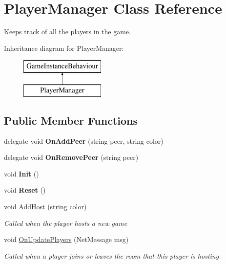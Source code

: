 \hypertarget{class_player_manager}{}\section{Player\+Manager Class Reference}
\label{class_player_manager}


Keeps track of all the players in the game.  


Inheritance diagram for Player\+Manager\+:\begin{figure}[H]
\begin{center}
\leavevmode
\includegraphics[height=2.000000cm]{class_player_manager}
\end{center}
\end{figure}
\subsection*{Public Member Functions}
\begin{DoxyCompactItemize}
\item 
delegate void {\bfseries On\+Add\+Peer} (string peer, string color)\hypertarget{class_player_manager_a23f484564192af50056793a8beda18ed}{}\label{class_player_manager_a23f484564192af50056793a8beda18ed}

\item 
delegate void {\bfseries On\+Remove\+Peer} (string peer)\hypertarget{class_player_manager_a2ab8d887716b904d65d7d7edacfbdad1}{}\label{class_player_manager_a2ab8d887716b904d65d7d7edacfbdad1}

\item 
void {\bfseries Init} ()\hypertarget{class_player_manager_abd70cd2d0328b9af204cfc4a8a5f2e69}{}\label{class_player_manager_abd70cd2d0328b9af204cfc4a8a5f2e69}

\item 
void {\bfseries Reset} ()\hypertarget{class_player_manager_a413d8be1a89c2428099ea76b74adef08}{}\label{class_player_manager_a413d8be1a89c2428099ea76b74adef08}

\item 
void \hyperlink{class_player_manager_adb5ef6634b1a67bd3a19af09e5cab970}{Add\+Host} (string color)
\begin{DoxyCompactList}\small\item\em Called when the player hosts a new game \end{DoxyCompactList}\item 
void \hyperlink{class_player_manager_affc64e53b2c473f3fc0b4c63756af102}{On\+Update\+Players} (Net\+Message msg)
\begin{DoxyCompactList}\small\item\em Called when a player joins or leaves the room that this player is hosting \end{DoxyCompactList}\end{DoxyCompactItemize}
